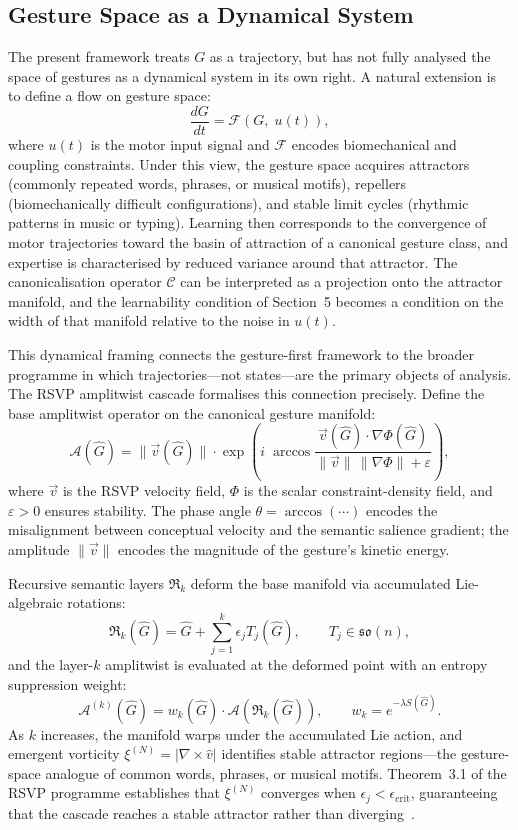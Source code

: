 \documentclass[11pt, a4paper]{article}
\begin{document}
\subsection{Gesture Space as a Dynamical System}

The present framework treats $G$ as a trajectory, but has not fully
analysed the space of gestures as a dynamical system in its own right.
A natural extension is to define a flow on gesture space:
\[
  \frac{dG}{dt} = \mathcal{F}(G,\; u(t)),
\]
where $u(t)$ is the motor input signal and $\mathcal{F}$ encodes
biomechanical and coupling constraints. Under this view, the gesture
space acquires attractors (commonly repeated words, phrases, or musical
motifs), repellers (biomechanically difficult configurations), and stable
limit cycles (rhythmic patterns in music or typing). Learning then
corresponds to the convergence of motor trajectories toward the basin of
attraction of a canonical gesture class, and expertise is characterised
by reduced variance around that attractor. The canonicalisation operator
$\mathcal{C}$ can be interpreted as a projection onto the attractor
manifold, and the learnability condition of Section~5 becomes a
condition on the width of that manifold relative to the noise in $u(t)$.

This dynamical framing connects the gesture-first framework to the
broader programme in which trajectories---not states---are the primary
objects of analysis. The RSVP amplitwist cascade formalises this
connection precisely. Define the base amplitwist operator on the
canonical gesture manifold:
\[
  \mathcal{A}(\hat{G}) = \|\vec{v}(\hat{G})\|\cdot
  \exp\!\left(i\;\arccos\frac{\vec{v}(\hat{G})\cdot\nabla\Phi(\hat{G})}
  {\|\vec{v}\|\,\|\nabla\Phi\|+\varepsilon}\right),
\]
where $\vec{v}$ is the RSVP velocity field, $\Phi$ is the scalar
constraint-density field, and $\varepsilon>0$ ensures stability. The
phase angle $\theta = \arccos(\cdots)$ encodes the misalignment between
conceptual velocity and the semantic salience gradient; the amplitude
$\|\vec{v}\|$ encodes the magnitude of the gesture's kinetic energy.

Recursive semantic layers $\mathfrak{R}_k$ deform the base manifold via
accumulated Lie-algebraic rotations:
\[
  \mathfrak{R}_k(\hat{G}) = \hat{G} + \sum_{j=1}^{k}\epsilon_j T_j(\hat{G}),
  \qquad T_j \in \mathfrak{so}(n),
\]
and the layer-$k$ amplitwist is evaluated at the deformed point with an
entropy suppression weight:
\[
  \mathcal{A}^{(k)}(\hat{G}) = w_k(\hat{G})\cdot\mathcal{A}(\mathfrak{R}_k(\hat{G})),
  \qquad w_k = e^{-\lambda S(\hat{G})}.
\]
As $k$ increases, the manifold warps under the accumulated Lie action,
and emergent vorticity $\xi^{(N)} = |\nabla\times\hat{v}|$ identifies
stable attractor regions---the gesture-space analogue of common words,
phrases, or musical motifs. Theorem~3.1 of the RSVP programme
establishes that $\xi^{(N)}$ converges when $\epsilon_j < \epsilon_{\mathrm{crit}}$,
guaranteeing that the cascade reaches a stable attractor rather than
diverging~\cite{juarrero1999}.
\end{document}
